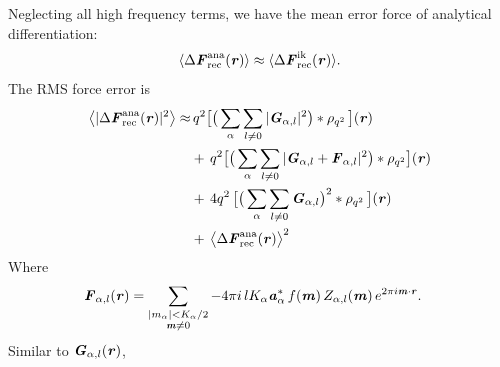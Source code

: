 \documentclass[aps,pre,preprint,unsortedaddress]{revtex4}
\renewcommand{\v}[1]{\textbf{\textit{#1}}}
\begin{document}
Neglecting all high frequency terms, we have the mean error force of
analytical differentiation:
\begin{align}\label{eqn:ana.meanf}
  \langle \Delta\v F_{\textrm{rec}}^{\textrm{ana}}(\v r)\rangle
  \approx
  \langle \Delta\v F_{\textrm{rec}}^{\textrm{ik}}(\v r)\rangle.
\end{align}
The RMS force error is 
\begin{align}\nonumber
  \big\langle
  \vert \Delta\v F_{\textrm{rec}}^{\textrm{ana}}(\v r)\vert^2
  \big\rangle
  \approx&\,
  q^2
  \big[
  \big(
  \sum_{\alpha} \sum_{l\neq 0}
  \vert \v G_{\alpha,l}\vert^2
  \big)
  \ast \rho_{q^2}
  \,\big] (\v r) \\\nonumber
  & +\,
  q^2
  \big[
  \big(
  \sum_{\alpha}\sum_{l\neq 0}
  \vert
  \v G_{\alpha,l} + \v F_{\alpha,l}\vert^2
  \big)
  \ast \rho_{q^2}
  \big]
  (\v r) \\ \nonumber
  & +\,
  4q^2\,
  \big[
  \big(
  \sum_{\alpha} \sum_{l\neq 0}  
  \v G_{\alpha,l}
  \big)^2
  \ast \rho_{q^2}\,
  \big] (\v r) \\\label{eqn:ana.error}
  & +\,
  \big\langle \Delta\v F_{\textrm{rec}}^{\textrm{ana}}(\v r)\big\rangle ^2
\end{align}
Where
\begin{align}
  \v F_{\alpha,l} (\v r)
  &=
  \sum_{
    \begin{subarray}{c}
      \vert m_{\alpha}\vert < K_\alpha/2\\
      \v m\neq 0
    \end{subarray}}
  -4 \pi i\, l K_\alpha \v a^\ast_\alpha\,f(\v m)\,
  Z_{\alpha,l}(\v m)\,
  e^{2\pi i\v m\cdot \v r}.
\end{align}
Similar to $\v G_{\alpha,l}(\v r)$,
\end{document}
